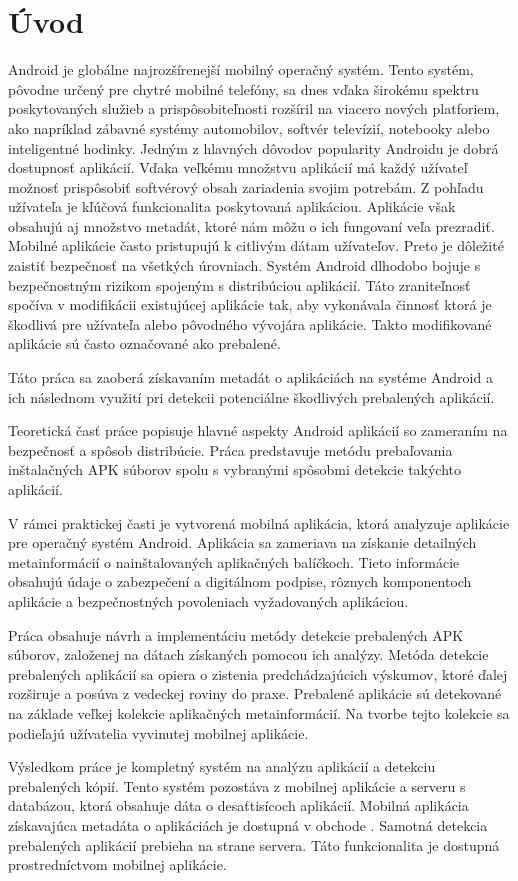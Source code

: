 \chapter*{Úvod}
Android je globálne najrozšírenejší mobilný operačný systém. Tento systém, pôvodne určený pre chytré mobilné telefóny, sa dnes vďaka širokému spektru poskytovaných služieb a prispôsobiteľnosti rozšíril na viacero nových platforiem, ako napríklad zábavné systémy automobilov, softvér televízií, notebooky alebo inteligentné hodinky. Jedným z hlavných dôvodov popularity Androidu je dobrá dostupnosť aplikácií. Vďaka veľkému množstvu aplikácií má každý užívateľ možnosť prispôsobiť softvérový obsah zariadenia svojim potrebám. Z pohľadu užívateľa je kľúčová funkcionalita poskytovaná aplikáciou. Aplikácie však obsahujú aj množstvo metadát, ktoré nám môžu o ich fungovaní veľa prezradiť. Mobilné aplikácie často pristupujú k citlivým dátam užívateľov. Preto je dôležité zaistiť bezpečnosť na všetkých úrovniach. Systém Android dlhodobo bojuje s bezpečnostným rizikom spojeným s distribúciou aplikácií. Táto zraniteľnosť spočíva v modifikácii existujúcej aplikácie tak, aby vykonávala činnosť ktorá je škodlivá pre užívateľa alebo pôvodného vývojára aplikácie. Takto modifikované aplikácie sú často označované ako prebalené.

Táto práca sa zaoberá získavaním metadát o aplikáciách na systéme Android a ich následnom využití pri detekcii potenciálne škodlivých prebalených aplikácií.

Teoretická časť práce popisuje hlavné aspekty Android aplikácií so zameraním na bezpečnosť a spôsob distribúcie. Práca predstavuje metódu prebaľovania inštalačných APK súborov spolu s vybranými spôsobmi detekcie takýchto aplikácií.

V rámci praktickej časti je vytvorená mobilná aplikácia, ktorá analyzuje aplikácie pre operačný systém Android. Aplikácia sa zameriava na získanie detailných metainformácií o nainštalovaných aplikačných balíčkoch. Tieto informácie obsahujú údaje o zabezpečení a digitálnom podpise, rôznych komponentoch aplikácie a bezpečnostných povoleniach vyžadovaných aplikáciou.

Práca obsahuje návrh a implementáciu metódy detekcie prebalených APK súborov, založenej na dátach získaných pomocou ich analýzy. Metóda detekcie prebalených aplikácií sa opiera o zistenia predchádzajúcich výskumov, ktoré ďalej rozširuje a posúva z vedeckej roviny do praxe. Prebalené aplikácie sú detekované na základe veľkej kolekcie aplikačných metainformácií. Na tvorbe tejto kolekcie sa podieľajú užívatelia vyvinutej mobilnej aplikácie.  

Výsledkom práce je kompletný systém na analýzu aplikácií a detekciu prebalených kópií. Tento systém pozostáva z mobilnej aplikácie a serveru s databázou, ktorá obsahuje dáta o desaťtisícoch aplikácií. Mobilná aplikácia získavajúca metadáta o aplikáciách je dostupná v obchode . Samotná detekcia prebalených aplikácií prebieha na strane servera. Táto funkcionalita je dostupná prostredníctvom mobilnej aplikácie.

